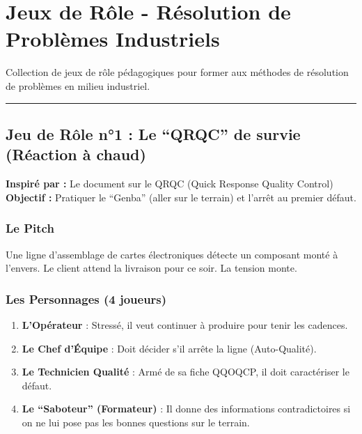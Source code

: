 \documentclass[
]{article}
\author{}
\date{\vspace{-2.5em}}
\providecommand{\tightlist}{%
  \setlength{\itemsep}{0pt}\setlength{\parskip}{0pt}}
\begin{document}
\section{Jeux de Rôle - Résolution de Problèmes
Industriels}\label{jeux-de-ruxf4le---ruxe9solution-de-probluxe8mes-industriels}

Collection de jeux de rôle pédagogiques pour former aux méthodes de
résolution de problèmes en milieu industriel.

\begin{center}\rule{0.5\linewidth}{0.5pt}\end{center}

\subsection{Jeu de Rôle n°1 : Le ``QRQC'' de survie (Réaction à
chaud)}\label{jeu-de-ruxf4le-n1-le-qrqc-de-survie-ruxe9action-uxe0-chaud}

\textbf{Inspiré par :} Le document sur le QRQC (Quick Response Quality
Control)\\
\textbf{Objectif :} Pratiquer le ``Genba'' (aller sur le terrain) et
l'arrêt au premier défaut.

\subsubsection{Le Pitch}\label{le-pitch}

Une ligne d'assemblage de cartes électroniques détecte un composant
monté à l'envers. Le client attend la livraison pour ce soir. La tension
monte.

\subsubsection{Les Personnages (4
joueurs)}\label{les-personnages-4-joueurs}

\begin{enumerate}
\def\labelenumi{\arabic{enumi}.}
\tightlist
\item
  \textbf{L'Opérateur} : Stressé, il veut continuer à produire pour
  tenir les cadences.
\item
  \textbf{Le Chef d'Équipe} : Doit décider s'il arrête la ligne
  (Auto-Qualité).
\item
  \textbf{Le Technicien Qualité} : Armé de sa fiche QQOQCP, il doit
  caractériser le défaut.
\item
  \textbf{Le ``Saboteur'' (Formateur)} : Il donne des informations
  contradictoires si on ne lui pose pas les bonnes questions sur le
  terrain.
\end{enumerate}
\end{document}
